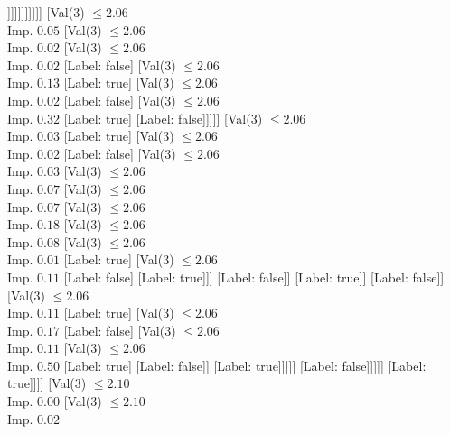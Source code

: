 \documentclass[margin=10pt]{standalone}
\begin{document}
\begin{forest}
																				]]]]]]]]]]
										[Val($3$) $ \leq 2.06$ \\ Imp. $0.05$
											[Val($3$) $ \leq 2.06$ \\ Imp. $0.02$
												[Val($3$) $ \leq 2.06$ \\ Imp. $0.02$
													[Label: false]
													[Val($3$) $ \leq 2.06$ \\ Imp. $0.13$
														[Label: true]
														[Val($3$) $ \leq 2.06$ \\ Imp. $0.02$
															[Label: false]
															[Val($3$) $ \leq 2.06$ \\ Imp. $0.32$
																[Label: true]
																[Label: false]]]]]
												[Val($3$) $ \leq 2.06$ \\ Imp. $0.03$
													[Label: true]
													[Val($3$) $ \leq 2.06$ \\ Imp. $0.02$
														[Label: false]
														[Val($3$) $ \leq 2.06$ \\ Imp. $0.03$
															[Val($3$) $ \leq 2.06$ \\ Imp. $0.07$
																[Val($3$) $ \leq 2.06$ \\ Imp. $0.07$
																	[Val($3$) $ \leq 2.06$ \\ Imp. $0.18$
																		[Val($3$) $ \leq 2.06$ \\ Imp. $0.08$
																			[Val($3$) $ \leq 2.06$ \\ Imp. $0.01$
																				[Label: true]
																				[Val($3$) $ \leq 2.06$ \\ Imp. $0.11$
																					[Label: false]
																					[Label: true]]]
																			[Label: false]]
																		[Label: true]]
																	[Label: false]]
																[Val($3$) $ \leq 2.06$ \\ Imp. $0.11$
																	[Label: true]
																	[Val($3$) $ \leq 2.06$ \\ Imp. $0.17$
																		[Label: false]
																		[Val($3$) $ \leq 2.06$ \\ Imp. $0.11$
																			[Val($3$) $ \leq 2.06$ \\ Imp. $0.50$
																				[Label: true]
																				[Label: false]]
																			[Label: true]]]]]
															[Label: false]]]]]
											[Label: true]]]]
								[Val($3$) $ \leq 2.10$ \\ Imp. $0.00$
									[Val($3$) $ \leq 2.10$ \\ Imp. $0.02$

\end{forest}
\end{document}
